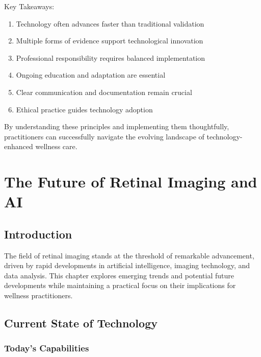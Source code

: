 \documentclass[
  Letterpaper,
]{scrbook}
\providecommand{\tightlist}{%
  \setlength{\itemsep}{0pt}\setlength{\parskip}{0pt}}\usepackage{longtable,booktabs,array}
\begin{document}
Key Takeaways:

\begin{enumerate}
\def\labelenumi{\arabic{enumi}.}
\tightlist
\item
  Technology often advances faster than traditional validation
\item
  Multiple forms of evidence support technological innovation
\item
  Professional responsibility requires balanced implementation
\item
  Ongoing education and adaptation are essential
\item
  Clear communication and documentation remain crucial
\item
  Ethical practice guides technology adoption
\end{enumerate}

By understanding these principles and implementing them thoughtfully,
practitioners can successfully navigate the evolving landscape of
technology-enhanced wellness care.


\chapter{The Future of Retinal Imaging and
AI}\label{the-future-of-retinal-imaging-and-ai}

\section{Introduction}\label{introduction-1}

The field of retinal imaging stands at the threshold of remarkable
advancement, driven by rapid developments in artificial intelligence,
imaging technology, and data analysis. This chapter explores emerging
trends and potential future developments while maintaining a practical
focus on their implications for wellness practitioners.

\section{Current State of Technology}\label{current-state-of-technology}

\subsection*{Today's Capabilities}\label{todays-capabilities}
\end{document}

